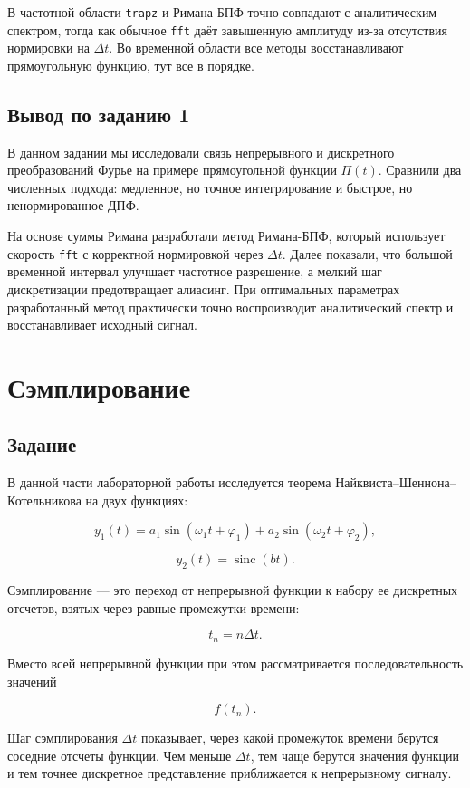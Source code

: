 \documentclass[a4paper, 12pt]{article}
\begin{document}
В частотной области \texttt{trapz} и Римана-БПФ точно совпадают с аналитическим спектром, тогда как обычное \texttt{fft} даёт завышенную амплитуду из-за отсутствия нормировки на $\Delta t$. Во временной области все методы восстанавливают прямоугольную функцию, тут все в порядке.


\subsection*{Вывод по заданию 1}

В данном задании мы исследовали связь непрерывного и дискретного преобразований Фурье на примере прямоугольной функции $\Pi(t)$. Сравнили два численных подхода: медленное, но точное интегрирование и быстрое, но ненормированное ДПФ. 

На основе суммы Римана разработали метод Римана-БПФ, который использует скорость \texttt{fft} с корректной нормировкой через $\Delta t$. Далее показали, что большой временной интервал улучшает частотное разрешение, а мелкий шаг дискретизации предотвращает алиасинг. При оптимальных параметрах  разработанный метод практически точно воспроизводит аналитический спектр и восстанавливает исходный сигнал.


\clearpage
\section{Сэмплирование}

\subsection{Задание}

В данной части лабораторной работы исследуется теорема Найквиста--Шеннона--Котельникова на двух функциях:

\[
y_1(t)=a_1\sin(\omega_1t+\varphi_1)+a_2\sin(\omega_2t+\varphi_2),
\]

\[
y_2(t)=\operatorname{sinc}(bt).
\]

Сэмплирование --- это переход от непрерывной функции к набору ее дискретных отсчетов, взятых через равные промежутки времени:

\[
t_n=n\Delta t.
\]

Вместо всей непрерывной функции при этом рассматривается последовательность значений

\[
f(t_n).
\]

Шаг сэмплирования \(\Delta t\) показывает, через какой промежуток времени берутся соседние отсчеты функции. Чем меньше \(\Delta t\), тем чаще берутся значения функции и тем точнее дискретное представление приближается к непрерывному сигналу.
\end{document}
